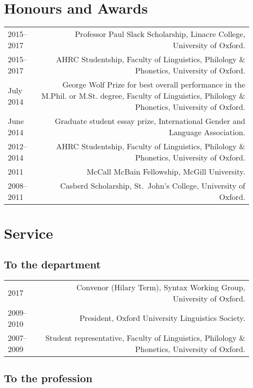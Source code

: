 \documentclass[11pt,a4paper,twoside]{article}
\makeatletter
\newenvironment{cvsection}{%
  \setlength{\extrarowheight}{0.70ex}
  \begin{longtable}[l]{@{} L R @{}}
}{%
  \end{longtable}
}
\makeatother
\begin{document}
\section*{Honours and Awards}

\begin{cvsection}
  2015--2017 	& Professor Paul Slack Scholarship,
  Linacre College, University of Oxford.\\
  2015--2017 	& AHRC Studentship, Faculty of
  Linguistics, Philology \& Phonetics, University of Oxford.\\
  July 2014	& George Wolf Prize for best overall
  performance in the M.Phil. or M.St. degree, Faculty of Linguistics,
  Philology \& Phonetics, University of Oxford.\\
  June 2014	& Graduate student essay prize,
  International Gender and Language Association.\\
  2012--2014	& AHRC Studentship, Faculty of
  Linguistics, Philology \& Phonetics, University of Oxford.\\
  2011		& McCall McBain Fellowship, McGill University.\\
  2008--2011	& Casberd Scholarship, St.\ John's
  College, University of Oxford.\\
\end{cvsection}

\section*{Service}

\subsection*{To the department}

\begin{cvsection}
  2017 		& Convenor (Hilary Term), Syntax Working Group, University of Oxford.\\
  2009--2010	& President, Oxford University Linguistics Society.\\
  2007--2009	& Student representative, Faculty of Linguistics, Philology \& Phonetics, University of Oxford.\\
\end{cvsection}

\subsection*{To the profession}
\end{document}
